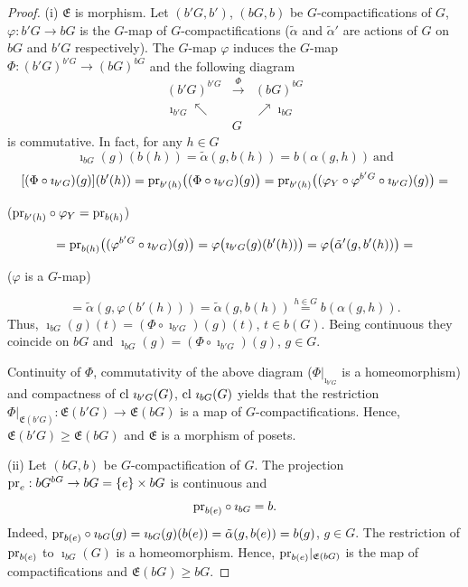 \documentclass{amsart}
\newcommand{\cl}{\mbox{{\rm cl}}}
\newcommand{\pr}{\mbox{{\rm pr}}}
\begin{document}
\begin{proof}
(i)  $\mathfrak{E}$ is morphism.  Let $(b' G, b')$, $(b G, b)$ be $G$-compactifications of $G$, $\varphi: b' G\to b G$ is the $G$-map of $G$-compactifications ($\tilde\alpha$ and $\tilde\alpha'$ are actions of $G$ on $b G$ and $b' G$ respectively). The $G$-map $\varphi$ induces the $G$-map  $\Phi:  (b' G)^{b' G}\to  (b G)^{b G}$ and the following diagram 
$$\begin{array}{ccl}
(b' G)^{b' G} & \stackrel{\Phi}{\longrightarrow} &  (b G)^{b G} \\
\imath_{b' G} \nwarrow &   &  \nearrow \imath_{b G} \\
 & G & 
\end{array}$$
is commutative.  In fact, for any  $h\in G$ 
$$\imath_{b G} (g)(b(h))=\tilde\alpha (g, b(h))=b(\alpha (g, h))\ \mbox{and}$$ 
$$[(\Phi\circ\imath_{b' G}) (g)] (b'(h))=\pr_{b'(h)}\big((\Phi\circ\imath_{b' G}) (g)\big)=\pr_{b'(h)}\big((\varphi_{Y}\circ\varphi^{b' G}\circ \imath_{b' G})(g)\big)=$$
\centerline{($\pr_{b'(h)}\circ\varphi_{Y}=\pr_{b(h)}$)}
$$=\pr_{b(h)}\big((\varphi^{b' G}\circ \imath_{b' G})(g)\big)=\varphi\big(\imath_{b' G} (g)(b'(h))\big)=\varphi\big(\tilde\alpha'(g, b'(h))\big)=$$
\centerline{($\varphi$ is a $G$-map)} 
$$=\tilde\alpha(g, \varphi (b'(h)))=\tilde\alpha(g, b(h))\stackrel{h\in G}=b(\alpha(g, h)).$$
Thus, $\imath_{b G} (g)(t)=(\Phi\circ\imath_{b' G}) (g)(t)$, $t\in b (G)$.  Being continuous they coincide on $b G$ and  $\imath_{b G} (g)=(\Phi\circ\imath_{b' G}) (g)$, $g\in G$.

Continuity of $\Phi$, commutativity of the above diagram ($\Phi|_{\imath_{b' G}}$ is a homeomorphism) and compactness of $\cl~\imath_{b' G} (G)$, $\cl~\imath_{b G} (G)$ yields that the restriction $\Phi|_{\mathfrak{E}(b' G)}: \mathfrak{E}(b' G)\to \mathfrak{E}(b G)$ is a map of $G$-compactifications. Hence, $\mathfrak{E}(b' G)\geq\mathfrak{E}(b G)$ and $\mathfrak{E}$ is a morphism of posets. 

\medskip

(ii) Let $(b G, b)$ be $G$-compactification of $G$. The projection $\pr_{e}: b G^{b G}\to b G=\{e\}\times b G$ is continuous and 
$$\pr_{b(e)}\circ\imath_{b G}=b.$$
Indeed, $\pr_{b(e)}\circ\imath_{b G}(g)=\imath_{b G}(g)(b(e))=\tilde\alpha (g, b(e))=b(g)$, $g\in G$. The restriction of $\pr_{b(e)}$ to $\imath_{b G} (G)$ is a homeomorphism. Hence,  $\pr_{b(e)}|_{\mathfrak{E}(b G)}$ is the map of compactifications and $\mathfrak{E}(b G)\geq b G$. 

\medskip


\end{proof}
\end{document}
